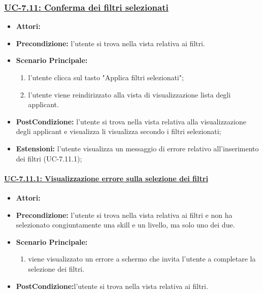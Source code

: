 \subsubsection{\underline{UC-7.11: Conferma dei filtri selezionati}}
\begin{itemize}
\item \textbf{Attori:}\loggedusr
\item \textbf{Precondizione:} l'utente si trova nella vista relativa ai filtri.
\item \textbf{Scenario Principale:}
\begin{enumerate}
	\item l'utente clicca sul tasto "Applica filtri selezionati";
	\item l'utente viene reindirizzato alla vista di visualizzazione lista degli applicant.
\end{enumerate}
\item \textbf{PostCondizione:} l'utente si trova nella vista relativa alla visualizzazione degli applicant e visualizza li visualizza secondo i filtri selezionati;
\item \textbf{Estensioni:} l'utente visualizza un messaggio di errore relativo all'inserimento dei filtri (UC-7.11.1);
\end{itemize}

\paragraph{\underline{UC-7.11.1: Visualizzazione errore sulla selezione dei filtri}}
\begin{itemize}
\item \textbf{Attori:}\loggedusr
\item \textbf{Precondizione:} l'utente si trova nella vista relativa ai filtri e non ha selezionato congiuntamente una skill e un livello, ma solo uno dei due.
\item \textbf{Scenario Principale:}
\begin{enumerate}
	\item viene visualizzato un errore a schermo che invita l'utente a completare la selezione dei filtri.
\end{enumerate}
\item \textbf{PostCondizione:}l'utente si trova nella vista relativa ai filtri.
\end{itemize}



